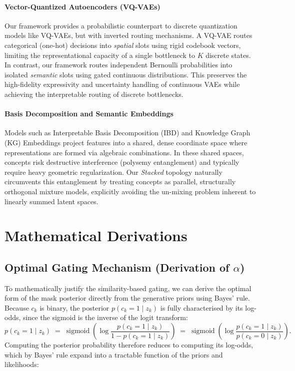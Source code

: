 \documentclass[11pt, a4paper]{article}
\begin{document}
\paragraph{Vector-Quantized Autoencoders (VQ-VAEs)}
Our framework provides a probabilistic counterpart to discrete quantization models like VQ-VAEs, but with inverted routing mechanisms. A VQ-VAE routes categorical (one-hot) decisions into \textit{spatial} slots using rigid codebook vectors, limiting the representational capacity of a single bottleneck to $K$ discrete states. In contrast, our framework routes independent Bernoulli probabilities into isolated \textit{semantic} slots using gated continuous distributions. This preserves the high-fidelity expressivity and uncertainty handling of continuous VAEs while achieving the interpretable routing of discrete bottlenecks. 

\paragraph{Basis Decomposition and Semantic Embeddings}
Models such as Interpretable Basis Decomposition (IBD) and Knowledge Graph (KG) Embeddings project features into a shared, dense coordinate space where representations are formed via algebraic combinations. In these shared spaces, concepts risk destructive interference (polysemy entanglement) and typically require heavy geometric regularization. Our \textit{Stacked} topology naturally circumvents this entanglement by treating concepts as parallel, structurally orthogonal mixture models, explicitly avoiding the un-mixing problem inherent to linearly summed latent spaces.

\appendix
\section{Mathematical Derivations}

\subsection{Optimal Gating Mechanism (Derivation of $\alpha$)}
To mathematically justify the similarity-based gating, we can derive the optimal form of the mask posterior directly from the generative priors using Bayes' rule. Because $c_k$ is binary, the posterior $p(c_k = 1 \mid z_k)$ is fully characterised by its log-odds, since the sigmoid is the inverse of the logit transform:
\[
p(c_k = 1 \mid z_k) \;=\; \operatorname{sigmoid}\!\left( \log \frac{p(c_k = 1 \mid z_k)}{1 - p(c_k = 1 \mid z_k)} \right) \;=\; \operatorname{sigmoid}\!\left( \log \frac{p(c_k = 1 \mid z_k)}{p(c_k = 0 \mid z_k)} \right).
\]
Computing the posterior probability therefore reduces to computing its log-odds, which by Bayes' rule expand into a tractable function of the priors and likelihoods:
\end{document}
